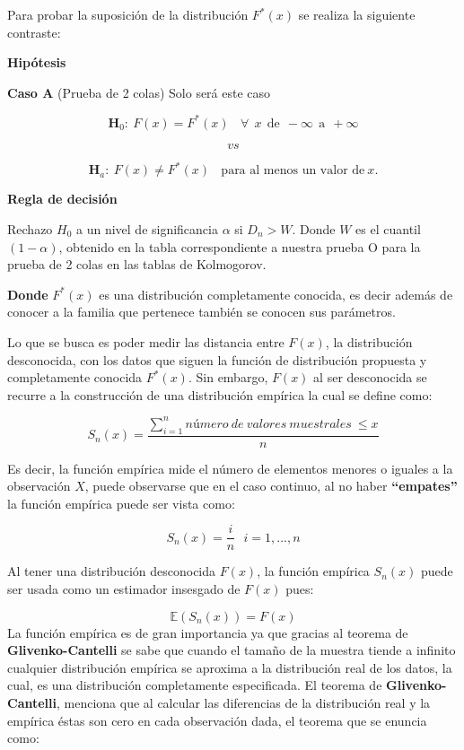 \documentclass[
  a4paper,
  oneside,
  openany]{book}
\begin{document}
Para probar la suposición de la distribución \(F^*(x)\) se realiza la siguiente contraste:

\textbf{Hipótesis}

\textbf{Caso A} (Prueba de 2 colas) Solo será este caso

\[\textbf{H}_0: \ F(x)=F^*(x) \ \ \ \ \forall \ \ x\ \  \mbox{de} \ \ -\infty \ \  \mbox{a} \ \  +\infty\]

\[vs\]

\[\textbf{H}_a: \ F(x) \neq F^*(x) \ \ \ \ \mbox{para al menos un valor de} \  x.\]

\textbf{Regla de decisión}

Rechazo \(H_0\) a un nivel de significancia \(\alpha\) si \(D_{n}>W\). Donde \(W\) es el cuantil \((1-\alpha)\), obtenido en la tabla correspondiente a nuestra prueba O para la prueba de 2 colas en las tablas de Kolmogorov.

\textbf{Donde} \(F^*(x)\) es una distribución completamente conocida, es decir además de conocer a la familia que pertenece también se conocen sus parámetros.

Lo que se busca es poder medir las distancia entre \(F(x)\), la distribución desconocida, con
los datos que siguen la función de distribución propuesta y completamente conocida \(F^*(x)\).
Sin embargo, \(F(x)\) al ser desconocida se recurre a la construcción de una distribución empírica
la cual se define como:

\[S_{n}(x)=\frac{ \sum_{i=1}^{n}número\ de\ valores\ muestrales\ \leq x}{n}\]

Es decir, la función empírica mide el número de elementos menores o iguales a la observación
\(X\), puede observarse que en el caso continuo, al no haber \textbf{``empates''} la función empírica puede
ser vista como:

\[S_{n}(x)=\frac{i}{n} \ \ \ i=1,\ldots,n\]

Al tener una distribución desconocida \(F(x)\), la función empírica \(S_{n}(x)\) puede ser usada
como un estimador insesgado de \(F(x)\) pues:

\[\mathbb{E}(S_{n}(x))=F(x)\]
La función empírica es de gran importancia ya que gracias al teorema de \textbf{Glivenko-Cantelli}
se sabe que cuando el tamaño de la muestra tiende a infinito cualquier distribución empírica
se aproxima a la distribución real de los datos, la cual, es una distribución completamente especificada. El teorema de \textbf{Glivenko-Cantelli}, menciona que al calcular las diferencias de la distribución real y la empírica éstas son cero en cada observación dada, el teorema que se enuncia como:
\end{document}
